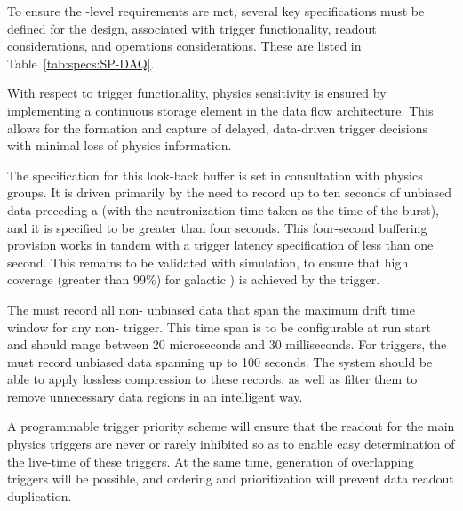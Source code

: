 
To ensure the -level requirements %
are met, several key specifications must be defined for the 
design, associated with trigger functionality, readout considerations,
and operations considerations.  These are listed in Table~\ref{tab:specs:SP-DAQ}.

 

With respect to trigger functionality, physics sensitivity is ensured
by implementing a continuous storage element in the data flow
architecture. %
This allows for the formation and capture of delayed, data-driven trigger decisions with minimal loss of physics information.
 

The
specification for this look-back buffer is set in consultation with
physics groups. It is driven primarily by the need to record up to ten
seconds of unbiased data preceding a  (with the
neutronization time taken as the time of the burst), and it is
specified to be greater than four seconds. This four-second
buffering provision works in tandem with a trigger latency
specification of less than one second. This remains to be validated
with simulation, to ensure that high coverage (greater than 99\%) for galactic ) is achieved by the  trigger.

The  must record all non- unbiased data that span the maximum drift time window for any non- trigger. 
This time span is to be configurable at run start and
should range between 20 microseconds and 30 milliseconds. For  triggers, the  must record unbiased data spanning up to 100 seconds.
The  system should be able to %
apply lossless compression to these records, as well as
filter them %
to remove unnecessary data regions
in an intelligent way.

A programmable trigger priority scheme will ensure %
that the readout for the main physics triggers
are never or rarely inhibited so as %
to enable easy determination of the live-time of
these triggers. %
At the same time, generation
of overlapping triggers will be possible, %
and ordering and prioritization will %
prevent data readout duplication. 

